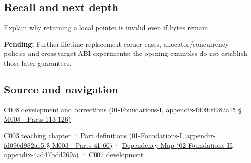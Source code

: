 \subsection{Recall and next depth}\label{recall-and-next-depth}

Explain why returning a local pointer is invalid even if bytes remain.

\textbf{Pending:} Further lifetime replacement corner cases, allocator/concurrency policies and cross-target ABI experiments; the opening examples do not establish those later guarantees.

\subsection{Source and navigation}\label{source-and-navigation}

\href{}{C008 development and corrections (01-Foundations-I, appendix-fd090d982a15 § M008 - Parts 113-126)}

\href{Continuous\%20Notes/Computing\%20Foundations\%20-\%20From\%20Bits\%20to\%20C++\%20and\%20Systems\%20APIs\#Where\%20the\%20bytes\%20live}{C003 teaching chapter} · \href{}{Part definitions (01-Foundations-I, appendix-fd090d982a15 § M003 - Parts 41-60)} · \href{}{Dependency Map (02-Foundations-II, appendix-4ad47bdd269a)} · \href{Continuous\%20Notes/Computing\%20Foundations\%20-\%20From\%20Bits\%20to\%20C++\%20and\%20Systems\%20APIs\#Storage\%20is\%20a\%20place;\%20an\%20object\%20is\%20its\%20occupant}{C007 development}
